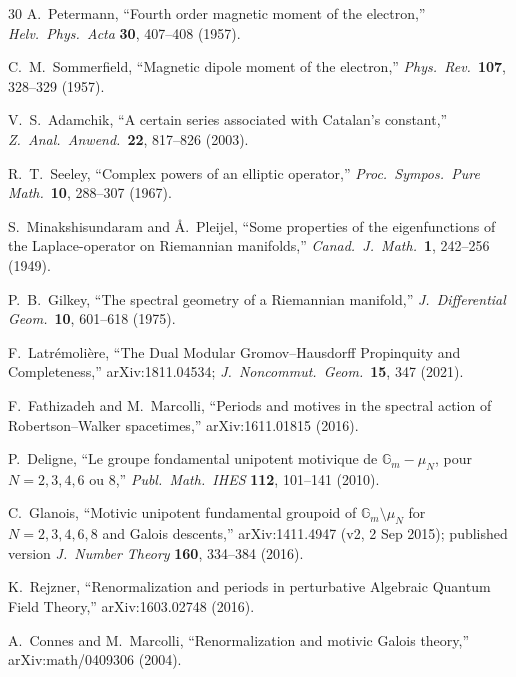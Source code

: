 \documentclass[aps,pra,twocolumn,superscriptaddress,longbibliography]{revtex4-2}
\begin{document}
\begin{thebibliography}{30}
A.~Petermann,
``Fourth order magnetic moment of the electron,''
\textit{Helv.\ Phys.\ Acta} \textbf{30}, 407--408 (1957).

C.~M.~Sommerfield,
``Magnetic dipole moment of the electron,''
\textit{Phys.\ Rev.}\ \textbf{107}, 328--329 (1957).

V.~S.~Adamchik,
``A certain series associated with Catalan's constant,''
\textit{Z.\ Anal.\ Anwend.}\ \textbf{22}, 817--826 (2003).

R.~T.~Seeley,
``Complex powers of an elliptic operator,''
\textit{Proc.\ Sympos.\ Pure Math.}\ \textbf{10}, 288--307 (1967).

S.~Minakshisundaram and {\AA}.~Pleijel,
``Some properties of the eigenfunctions of the Laplace-operator
on Riemannian manifolds,''
\textit{Canad.\ J.\ Math.}\ \textbf{1}, 242--256 (1949).

P.~B.~Gilkey,
``The spectral geometry of a Riemannian manifold,''
\textit{J.\ Differential Geom.}\ \textbf{10}, 601--618 (1975).

F.~Latr\'emoli\`ere, ``The Dual Modular Gromov--Hausdorff Propinquity and Completeness,''
arXiv:1811.04534;
\textit{J.\ Noncommut.\ Geom.}\ \textbf{15}, 347 (2021).

F.~Fathizadeh and M.~Marcolli,
``Periods and motives in the spectral action of Robertson--Walker spacetimes,''
arXiv:1611.01815 (2016).

P.~Deligne,
``Le groupe fondamental unipotent motivique de
$\mathbb{G}_m - \mu_N$, pour $N = 2, 3, 4, 6$ ou $8$,''
\textit{Publ.~Math.~IHES} \textbf{112}, 101--141 (2010).

C.~Glanois,
``Motivic unipotent fundamental groupoid of
$\mathbb{G}_m \setminus \mu_N$ for $N = 2, 3, 4, 6, 8$ and Galois descents,''
arXiv:1411.4947 (v2, 2 Sep 2015);
published version \textit{J.~Number Theory} \textbf{160}, 334--384 (2016).

K.~Rejzner,
``Renormalization and periods in perturbative Algebraic Quantum Field Theory,''
arXiv:1603.02748 (2016).

A.~Connes and M.~Marcolli,
``Renormalization and motivic Galois theory,''
arXiv:math/0409306 (2004).


\end{thebibliography}
\end{document}
